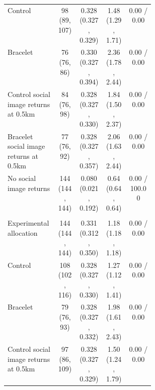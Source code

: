 \begin{longtable}{p{0.34\linewidth}cccc}
Control & \makecell[c]{98\\(89, 107)} & \makecell[c]{0.328\\(0.327, 0.329)} & \makecell[c]{1.48\\(1.29, 1.71)} & 0.00 / 0.00 \\
Bracelet & \makecell[c]{76\\(76, 86)} & \makecell[c]{0.330\\(0.327, 0.394)} & \makecell[c]{2.36\\(1.78, 2.44)} & 0.00 / 0.00 \\
Control social image returns at 0.5km & \makecell[c]{84\\(76, 98)} & \makecell[c]{0.328\\(0.327, 0.330)} & \makecell[c]{1.84\\(1.50, 2.37)} & 0.00 / 0.00 \\
Bracelet social image returns at 0.5km & \makecell[c]{77\\(76, 92)} & \makecell[c]{0.328\\(0.327, 0.357)} & \makecell[c]{2.06\\(1.63, 2.44)} & 0.00 / 0.00 \\
No social image returns & \makecell[c]{144\\(144, 144)} & \makecell[c]{0.080\\(0.021, 0.192)} & \makecell[c]{0.64\\(0.64, 0.64)} & 0.00 / 100.00 \\
\addlinespace
\multicolumn{5}{l}{\textit{Any-signal/no-signal social image weight}} \\
Experimental allocation & \makecell[c]{144\\(144, 144)} & \makecell[c]{0.331\\(0.312, 0.350)} & \makecell[c]{1.18\\(1.18, 1.18)} & 0.00 / 0.00 \\
Control & \makecell[c]{108\\(102, 116)} & \makecell[c]{0.328\\(0.327, 0.330)} & \makecell[c]{1.27\\(1.12, 1.41)} & 0.00 / 0.00 \\
Bracelet & \makecell[c]{79\\(76, 93)} & \makecell[c]{0.328\\(0.327, 0.332)} & \makecell[c]{1.98\\(1.61, 2.43)} & 0.00 / 0.00 \\
Control social image returns at 0.5km & \makecell[c]{97\\(86, 109)} & \makecell[c]{0.328\\(0.327, 0.329)} & \makecell[c]{1.50\\(1.24, 1.79)} & 0.00 / 0.00 \\

\end{longtable}
